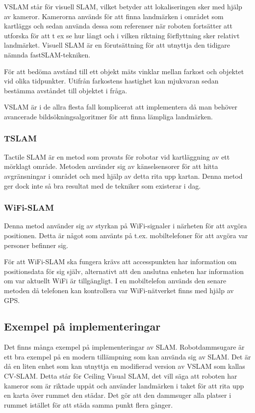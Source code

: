 \documentclass[a4paper,12pt,fleqn]{article}
\begin{document}
VSLAM står för visuell SLAM, vilket betyder att lokaliseringen sker med hjälp av kameror. Kamerorna används för att finna landmärken i området som kartläggs och sedan använda dessa som referenser när roboten fortsätter att utforska för att t ex se hur långt och i vilken riktning förflyttning sker relativt landmärket. Visuell SLAM är en förutsättning för att utnyttja den tidigare nämnda fastSLAM-tekniken. 

För att bedöma avstånd till ett objekt mäts vinklar mellan farkost och objektet vid olika tidpunkter. Utifrån farkostens hastighet kan mjukvaran sedan bestämma avståndet till objektet i fråga. 

VSLAM är i de allra flesta fall komplicerat att implementera då man behöver avancerade bildsökningsalgoritmer för att finna lämpliga landmärken. 

\subsubsection{TSLAM}
Tactile SLAM är en metod som provats för robotar vid kartläggning av ett mörklagt område. Metoden använder sig av känselsensorer för att hitta avgränsningar i området och med hjälp av detta rita upp kartan. Denna metod ger dock inte så bra resultat med de tekniker som existerar i dag.

\subsubsection{WiFi-SLAM}
Denna metod använder sig av styrkan på WiFi-signaler i närheten för att avgöra positionen. Detta är något som använts på t.ex. mobiltelefoner för att avgöra var personer befinner sig. 

För att WiFi-SLAM ska fungera krävs att accesspunkten har information om positionsdata för sig själv, alternativt att den anslutna enheten har information om var aktuellt WiFi är tillgängligt. I en mobiltelefon används den senare metoden då telefonen kan kontrollera var WiFi-nätverket finns med hjälp av GPS. 

\subsection{Exempel på implementeringar}

Det finns många exempel på implementeringar av SLAM. Robotdammsugare är ett bra exempel på en modern tillämpning som kan använda sig av SLAM. Det är då en liten enhet som kan utnyttja en modifierad version av VSLAM som kallas CV-SLAM. Detta står för Ceiling Visual SLAM, det vill säga att roboten har kameror som är riktade uppåt och använder landmärken i taket för att rita upp en karta över rummet den städar. Det gör att den dammsuger alla platser i rummet istället för att städa samma punkt flera gånger. 
\end{document}
